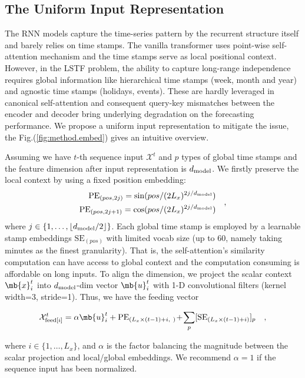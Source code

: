 \begin{appendices}
\section{The Uniform Input Representation}
\label{sec:appendix.input}
The RNN models \cite{schuster1997bidirectional,hochreiter1997long,chung2014empirical,sutskever2014sequence,conf/ijcai/QinSCCJC17,chang2018memory} capture the time-series pattern by the recurrent structure itself and barely relies on time stamps. The vanilla transformer \cite{vaswani2017attention, devlin2018bert} uses point-wise self-attention mechanism and the time stamps serve as local positional context. However, in the LSTF problem, the ability to capture long-range independence requires global information like hierarchical time stamps (week, month and year) and agnostic time stamps (holidays, events). These are hardly leveraged in canonical self-attention and consequent query-key mismatches between the encoder and decoder bring underlying degradation on the forecasting performance. We propose a uniform input representation to mitigate the issue, the Fig.(\ref{fig:method.embed}) gives an intuitive overview.

Assuming we have $t$-th sequence input $\mathcal{X}^t$ and $p$ types of global time stamps and the feature dimension after input representation is $d_{\rm{model}}$. We firstly preserve the local context by using a fixed position embedding:
\begin{equation}
\begin{aligned}
   \textrm{PE}_{(pos, 2j)} = \sin(pos/(2L_x)^{2j/d_{\rm{model}}}) \\
   \textrm{PE}_{(pos, 2j+1)} = \cos(pos/(2L_x)^{2j/d_{\rm{model}}})
\end{aligned}\quad,
\end{equation}
where $j\in\{1, \dots, \lfloor {d_{\rm{model}}}/{2} \rfloor \}$. Each global time stamp is employed by a learnable stamp embeddings $\textrm{SE}_{(pos)}$ with limited vocab size (up to 60, namely taking minutes as the finest granularity). That is, the self-attention's similarity computation can have access to global context and the computation consuming is affordable on long inputs. To align the dimension, we project the scalar context $\mb{x}^t_{i}$ into $d_{\rm{model}}$-dim vector $\mb{u}^t_{i}$ with 1-D convolutional filters (kernel width=3, stride=1). Thus, we have the feeding vector
\begin{small}
\begin{equation}\label{eq:method.input.sum}
  \mathcal{X}^t_{\textrm{feed}[i]} = \alpha \mb{u}^t_i + \textrm{PE}_{(L_x \times (t-1)+i,~)}  \!+\! \sum_{p} [\textrm{SE}_{(L_x \times (t-1)+i)}]_p \quad,
\end{equation}
\end{small}
where $i\in\{1, \dots, L_x\}$, and $\alpha$ is the factor balancing the magnitude between the scalar projection and local/global embeddings. We recommend $\alpha=1$ if the sequence input has been normalized.


\end{appendices}
